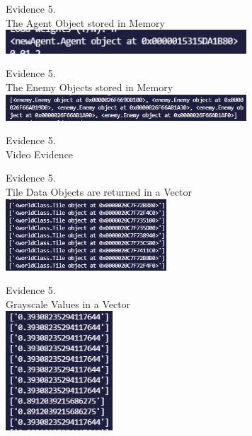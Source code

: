 \setcounter{magicrownumbers}{0}
\begin{center}
    {\large Evidence 5.\rn } \\ 
    \vspace{0.3cm}
    The Agent Object stored in Memory \\
    \includegraphics[width=9cm]{Images/Testing/T5.1.1.PNG} \\
    \vspace{1cm}

    {\large Evidence 5.\rn } \\ 
    \vspace{0.3cm}
    The Enemy Objects stored in Memory \\
    \includegraphics[width=9cm]{Images/Testing/T5.2.1.PNG} \\
    \vspace{1cm}

    {\large Evidence 5.\rn } \\ 
    \vspace{0.3cm}
    Video Evidence
    \vspace{1cm}

    {\large Evidence 5.\rn } \\ 
    \vspace{0.3cm}
    Tile Data Objects are returned in a Vector \\
    \includegraphics[width=6cm]{Images/Testing/T5.4.1.PNG} \\
    \vspace{1cm}

    {\large Evidence 5.\rn } \\ 
    \vspace{0.3cm}
    Grayscale Values in a Vector \\
    \includegraphics[width=4cm]{Images/Testing/T5.5.1.PNG} \\
    \vspace{1cm}


\end{center}
